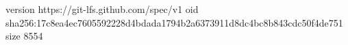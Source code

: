 version https://git-lfs.github.com/spec/v1
oid sha256:17c8ea4ec7605592228d4bdada1794b2a6373911d8dc4bc8b843cdc50f4de751
size 8554
